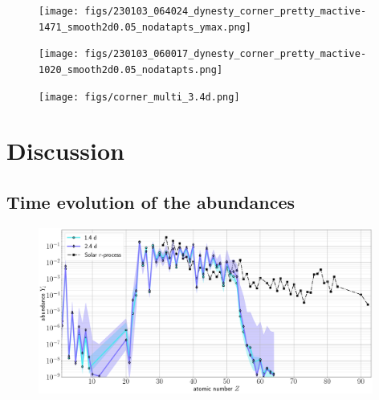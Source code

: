 \documentclass[twocolumn, twocolappendix]{aastex63}
\begin{document}
\begin{figure}[!ht]
    \texttt{[image: figs/230103\_064024\_dynesty\_corner\_pretty\_mactive-1471\_smooth2d0.05\_nodatapts\_ymax.png]}
    \label{fig:corner_multi_1.4}
\end{figure}

\begin{figure}[!ht]
    \texttt{[image: figs/230103\_060017\_dynesty\_corner\_pretty\_mactive-1020\_smooth2d0.05\_nodatapts.png]}
    \label{fig:corner_multi_2.4}
\end{figure}

\begin{figure}[!ht]
    \texttt{[image: figs/corner\_multi\_3.4d.png]}
    \label{fig:corner_multi_3.4}
\end{figure}






\section{Discussion}\label{sec:disco}


\subsection{Time evolution of the abundances}

\begin{figure}[!ht]
    \includegraphics[width=0.98\textwidth]{figs/compare_abunds_220808_014638-221022_084052_posterior-50samples.png}
    \label{fig:abunds_time_evolution}
\end{figure}
\end{document}
